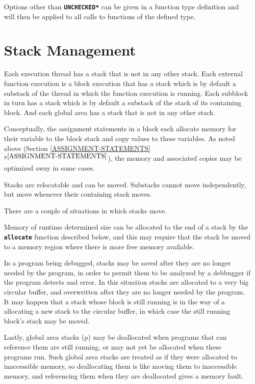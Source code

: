 \documentclass[12pt]{article}
\newcommand{\TT}[1]{{\tt \bfseries #1}}
\newcommand{\itemref}[1]{\ref{#1}$^{p\pageref{#1}}$}
\newcommand{\pagref}[1]{p\pageref{#1}}
\begin{document}
Options other than \TT{*UNCHECKED*} can be given in a function type
definition and will then be applied to all calls to functions of the
defined type.

\section{Stack Management}
\label{STACK-MANAGEMENT}

Each execution thread has a stack that is not in any other
stack.  Each external function
execution is a block execution that has a stack which is
by default a substack of the thread in which the function
execution is running.  Each subblock in turn has a stack
which is by default a substack of the stack of its containing block.
And each global area has a stack that is not in any other stack.

Conceptually, the assignment statements in a block each allocate memory for
their variable to the block stack and copy values to these
variables.  As noted above (Section \itemref{ASSIGNMENT-STATEMENTS}),
the memory and associated copies may be
optimized away in some cases.

Stacks are relocatable and can be moved.  Substacks cannot move independently,
but move whenever their containing stack moves.

There are a couple of situations in which stacks move.

Memory of runtime determined size can be allocated to the end of
a stack by the \TT{allocate} function described below, and this may
require that the stack be moved to a memory region where there is
more free memory available.

In a program being debugged, stacks may be saved after they are no
longer needed by the program, in order to permit them to be analyzed
by a debbugger if the program detects and error.  In this situation
stacks are allocated to a very big circular buffer, and overwritten
after they are no longer needed by the program.  It may happen that
a stack whose block is still running is in the way of a allocating
a new stack to the circular buffer, in which case the still running
block's stack may be moved.

Lastly, global area stacks (\pagref{GLOBAL-AREAS})
may be deallocated when programs that
can reference them are still running, or may not yet be allocated
when these programs run.  Such global area stacks are treated as if
they were allocated to inaccessible memory, so deallocating them
is like moving them to inaccessible memory, and referencing
them when they are deallocated gives a memory fault.
\end{document}
